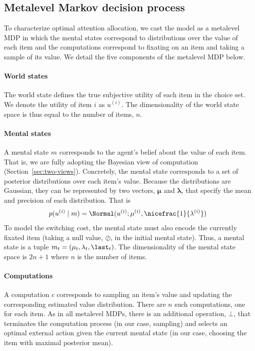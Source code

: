 \subsection{Metalevel Markov decision process}\label{sec:attention-mdp}

To characterize optimal attention allocation, we cast the model as a metalevel MDP in which the mental states correspond to distributions over the value of each item and the computations correspond to fixating on an item and taking a sample of its value. We detail the five components of the metalevel MDP below.

\paragraph{World states}
The world state defines the true subjective utility of each item in the choice set. We denote the utility of item $i$ as $u^{(i)}$. The dimensionality of the  world state space is thus equal to the number of items, $n$.

\paragraph{Mental states}
A mental state $m$ corresponds to the agent's belief about the value of each item. That is, we are fully adopting the Bayesian view of computation (Section~\ref{sec:two-views}). Concretely, the mental state corresponds to a set of posterior distributions over each item's value. Because the distributions are Gaussian, they can be represented by two vectors, $\mathbf{\mu}$ and $\mathbf{\lambda}$, that specify the mean and precision of each distribution. That is 
$$
p(u^{(i)} \mid m) = \Normal(u^{(i)}; \mu^{(i)}, \nicefrac{1}{\lambda^{(i)}})
$$
To model the switching cost, the mental state must also encode the currently fixated item (taking a null value, $\oslash$, in the initial mental state). Thus, a mental state is a tuple $m_t = (\mathbf{\mu}_t, \mathbf{\lambda}_t, \last_t)$. The dimensionality of the mental state space is $2n + 1$ where $n$ is the number of items.

\paragraph{Computations}
A computation $c$ corresponds to sampling an item's value and updating the corresponding estimated value distribution. There are $n$ such computations, one for each item. As in all metalevel MDPs, there is an additional operation, $\bot$, that terminates the computation process (in our case, sampling) and selects an optimal external action given the current mental state (in our case, choosing the item with maximal posterior mean).

